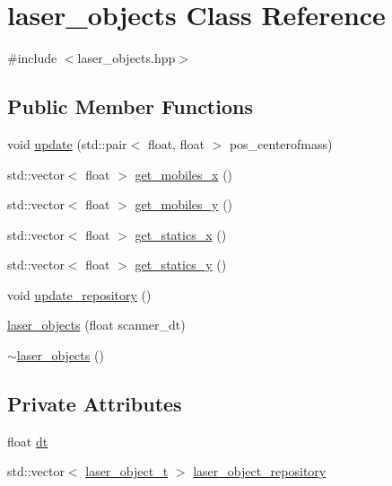 \hypertarget{classlaser__objects}{}\section{laser\+\_\+objects Class Reference}
\label{classlaser__objects}


{\ttfamily \#include $<$laser\+\_\+objects.\+hpp$>$}

\subsection*{Public Member Functions}
\begin{DoxyCompactItemize}
\item 
void \hyperlink{classlaser__objects_a8e139bb70c4e8589e512a71f244b45ef}{update} (std\+::pair$<$ float, float $>$ pos\+\_\+centerofmass)
\item 
std\+::vector$<$ float $>$ \hyperlink{classlaser__objects_a5d288e741d7fca610899fd1b9f822826}{get\+\_\+mobiles\+\_\+x} ()
\item 
std\+::vector$<$ float $>$ \hyperlink{classlaser__objects_ab76cec03e47705fcad27a2cf9d9b62a0}{get\+\_\+mobiles\+\_\+y} ()
\item 
std\+::vector$<$ float $>$ \hyperlink{classlaser__objects_a1f4e68699b3a5ea853dce7e45123a284}{get\+\_\+statics\+\_\+x} ()
\item 
std\+::vector$<$ float $>$ \hyperlink{classlaser__objects_a6063594fe030d1d8c33e6f4d2e1b3ef0}{get\+\_\+statics\+\_\+y} ()
\item 
void \hyperlink{classlaser__objects_a8491aebb670f24305deeb85a9da26ede}{update\+\_\+repository} ()
\item 
\hyperlink{classlaser__objects_a9be2a1b55a49c0083bc37ac770ca2fa7}{laser\+\_\+objects} (float scanner\+\_\+dt)
\item 
\hyperlink{classlaser__objects_ae80a2220fefdf144ae5e653d902d36a2}{$\sim$laser\+\_\+objects} ()
\end{DoxyCompactItemize}
\subsection*{Private Attributes}
\begin{DoxyCompactItemize}
\item 
float \hyperlink{classlaser__objects_af193b94d6f48b40418f4148402f8528f}{dt}
\item 
std\+::vector$<$ \hyperlink{classlaser__object__t}{laser\+\_\+object\+\_\+t} $>$ \hyperlink{classlaser__objects_a33796fdd4a95d6f432351934b08ac7e9}{laser\+\_\+object\+\_\+repository}
\end{DoxyCompactItemize}


